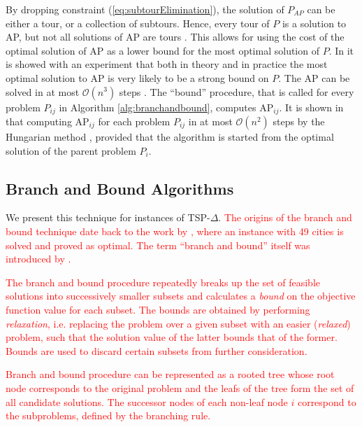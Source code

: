 \documentclass{mprop}
\theoremstyle{definition}
\begin{document}
By dropping constraint (\ref{eq:subtourElimination}), the solution of $P_{AP}$ can be either a tour, or a collection of subtours. Hence, every tour of $P$ is a solution to AP, but not all solutions of AP are tours \citep{Bellmore71}. This allows for using the cost of the optimal solution of AP as a lower bound for the most optimal solution of $P$. In \cite{tspbible} it is showed with an experiment that both in theory and in practice the most optimal solution to AP is very likely to be a strong bound on $P$. The AP can be solved in at most $\mathcal{O}(n^{3})$ steps \citep{Kuhn55,Christofides75}. The ``bound'' procedure, that is called for every problem $P_{ij}$ in Algorithm \ref{alg:branchandbound}, computes AP$_{ij}$. It is shown in \cite{tspbible} that computing AP$_{ij}$ for each problem $P_{ij}$ in at most $\mathcal{O}(n^{2})$ steps by the Hungarian method \citep{Kuhn55}, provided that the algorithm is started from the optimal solution of the parent problem $P_{i}$.


\subsection{Branch and Bound Algorithms}
\label{branchandbound}
We present this technique for instances of TSP-$\Delta$. 
\textcolor{red}{
The origins of the branch and bound technique date back to the work by \citet{Dantzig54}, where an instance with 49 cities is solved and proved as optimal. The term ``branch and bound'' itself was introduced by \citet{Little63}.} 

\textcolor{red}{The branch and bound procedure repeatedly breaks up the set of feasible solutions into successively smaller subsets and calculates a \textit{bound} on the objective function value for each subset. The bounds are obtained by performing \textit{relaxation}, i.e. replacing the problem over a given subset with an easier (\textit{relaxed}) problem, such that the solution value of the latter bounds that of the former. Bounds are used to discard certain subsets from further consideration.}

\textcolor{red}{
Branch and bound procedure can be represented as a rooted tree whose root node corresponds to the original problem and the leafs of the tree form the set of all candidate solutions. The successor nodes of each non-leaf node $i$ correspond to the subproblems, defined by the branching rule.}
\end{document}

